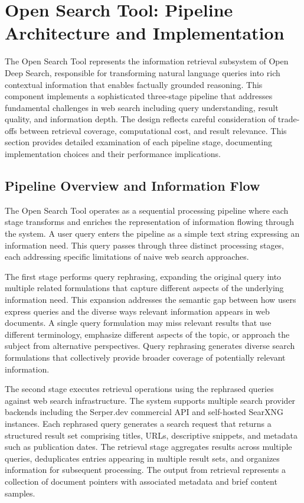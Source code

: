 \section{Open Search Tool: Pipeline Architecture and Implementation}

The Open Search Tool represents the information retrieval subsystem of Open Deep Search, responsible for transforming natural language queries into rich contextual information that enables factually grounded reasoning. This component implements a sophisticated three-stage pipeline that addresses fundamental challenges in web search including query understanding, result quality, and information depth. The design reflects careful consideration of trade-offs between retrieval coverage, computational cost, and result relevance. This section provides detailed examination of each pipeline stage, documenting implementation choices and their performance implications.

\subsection{Pipeline Overview and Information Flow}

The Open Search Tool operates as a sequential processing pipeline where each stage transforms and enriches the representation of information flowing through the system. A user query enters the pipeline as a simple text string expressing an information need. This query passes through three distinct processing stages, each addressing specific limitations of naive web search approaches.

The first stage performs query rephrasing, expanding the original query into multiple related formulations that capture different aspects of the underlying information need. This expansion addresses the semantic gap between how users express queries and the diverse ways relevant information appears in web documents. A single query formulation may miss relevant results that use different terminology, emphasize different aspects of the topic, or approach the subject from alternative perspectives. Query rephrasing generates diverse search formulations that collectively provide broader coverage of potentially relevant information.

The second stage executes retrieval operations using the rephrased queries against web search infrastructure. The system supports multiple search provider backends including the Serper.dev commercial API and self-hosted SearXNG instances. Each rephrased query generates a search request that returns a structured result set comprising titles, URLs, descriptive snippets, and metadata such as publication dates. The retrieval stage aggregates results across multiple queries, deduplicates entries appearing in multiple result sets, and organizes information for subsequent processing. The output from retrieval represents a collection of document pointers with associated metadata and brief content samples.

